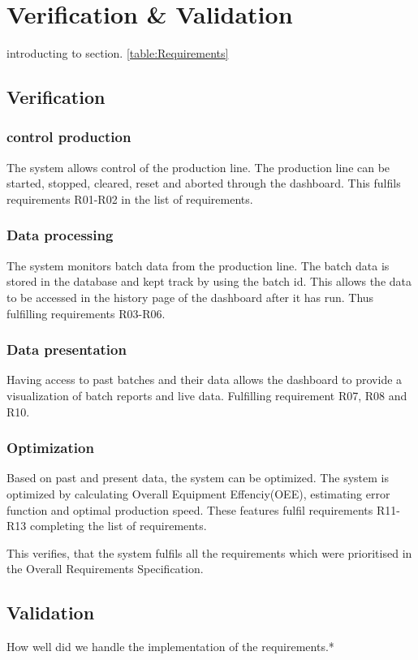 \section{Verification \& Validation}
introducting to section.
\ref{table:Requirements}


\subsection{Verification}
\subsubsection{control production} 
The system allows control of the production line. The production line can be 
started, stopped, cleared, reset and aborted through the dashboard. This fulfils 
requirements R01-R02 in the list of requirements.

\subsubsection{Data processing}
The system monitors batch data from the production line. The batch data is 
stored in the database and kept track by using the batch id. This allows the 
data to be accessed in the history page of the dashboard after it has run. Thus 
fulfilling requirements R03-R06.

\subsubsection{Data presentation}
Having access to past batches and their data allows the dashboard to provide a 
visualization of batch reports and live data. Fulfilling requirement R07, R08 
and R10.

\subsubsection{Optimization}
Based on past and present data, the system can be optimized. The system is 
optimized by calculating Overall Equipment Effenciy(OEE), estimating error 
function and optimal production speed. These features fulfil requirements 
R11-R13 completing the list of requirements.

This verifies, that the system fulfils all the requirements which were 
prioritised in the Overall Requirements Specification.

\subsection{Validation}
How well did we handle the implementation of the requirements.*